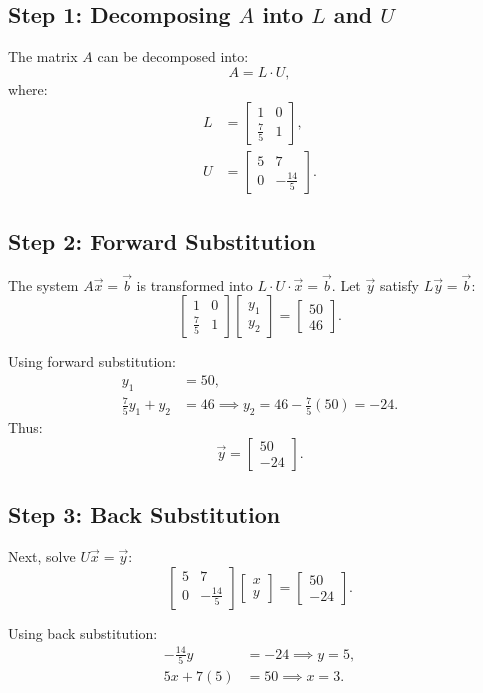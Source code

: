 \documentclass[journal]{IEEEtran}
\newcommand{\myvec}[1]{\begin{bmatrix}#1\end{bmatrix}}
\begin{document}
\subsection{Step 1: Decomposing \(A\) into \(L\) and \(U\)}
The matrix \(A\) can be decomposed into:
\begin{equation}
    A = L \cdot U,
\end{equation}
where:
\begin{align}
    L &= \myvec{1 & 0 \\ \frac{7}{5} & 1}, \\
    U &= \myvec{5 & 7 \\ 0 & -\frac{14}{5}}.
\end{align}

\subsection{Step 2: Forward Substitution}
The system \(A\vec{x} = \vec{b}\) is transformed into \(L \cdot U \cdot \vec{x} = \vec{b}\). Let \(\vec{y}\) satisfy \(L\vec{y} = \vec{b}\):
\begin{equation}
    \myvec{1 & 0 \\ \frac{7}{5} & 1} \myvec{y_1 \\ y_2} = \myvec{50 \\ 46}.
\end{equation}

Using forward substitution:
\begin{align}
    y_1 &= 50, \\
    \frac{7}{5}y_1 + y_2 &= 46 \implies y_2 = 46 - \frac{7}{5}(50) = -24.
\end{align}
Thus:
\begin{equation}
    \vec{y} = \myvec{50 \\ -24}.
\end{equation}

\subsection{Step 3: Back Substitution}
Next, solve \(U\vec{x} = \vec{y}\):
\begin{equation}
    \myvec{5 & 7 \\ 0 & -\frac{14}{5}} \myvec{x \\ y} = \myvec{50 \\ -24}.
\end{equation}

Using back substitution:
\begin{align}
    -\frac{14}{5}y &= -24 \implies y = 5, \\
    5x + 7(5) &= 50 \implies x = 3.
\end{align}
\end{document}
